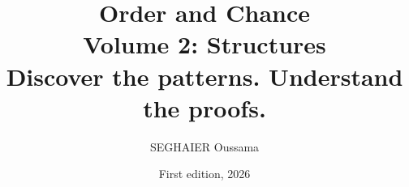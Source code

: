 \documentclass[11pt,openany]{book}
\title{\Huge\textbf{Order and Chance}\\[0.4em]\LARGE Volume 2: Structures\\[0.6em]
\Large Discover the patterns. Understand the proofs.}
\author{SEGHAIER Oussama}
\date{First edition, 2026}
\begin{document}
\frontmatter
\makecover
\maketitle

\tableofcontents

\mainmatter














\appendix














\end{document}
